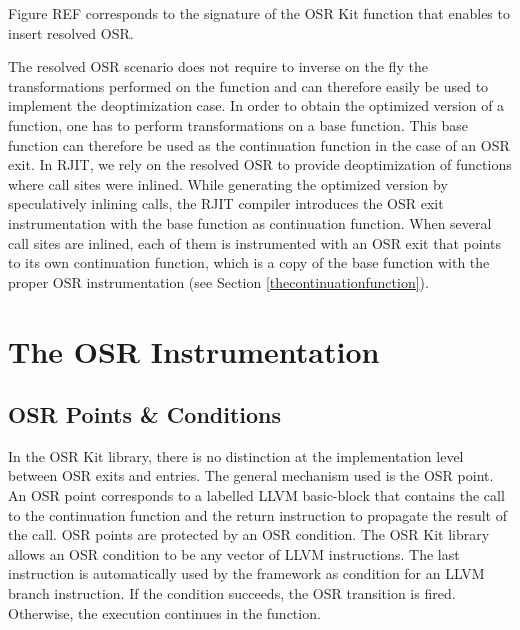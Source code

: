 Figure REF corresponds to the signature of the OSR Kit function that enables to insert resolved OSR.\\

\begin{minipage}{\linewidth}
\end{minipage}

The resolved OSR scenario does not require to inverse on the fly the transformations performed on the function and can therefore easily be used to implement the deoptimization case.
In order to obtain the optimized version of a function, one has to perform transformations on a base function.
This base function can therefore be used as the continuation function in the case of an OSR exit.
In RJIT, we rely on the resolved OSR to provide deoptimization of functions where call sites were inlined.
While generating the optimized version by speculatively inlining calls, the RJIT compiler introduces the OSR exit instrumentation with the base function as continuation function.
When several call sites are inlined, each of them is instrumented with an OSR exit that points to its own continuation function, which is a copy of the base function with the proper OSR instrumentation (see Section \ref{thecontinuationfunction}).\\



\section{The OSR Instrumentation}
\subsection{OSR Points \& Conditions}

In the OSR Kit library\cite{OSRKit}, there is no distinction at the implementation level between OSR exits and entries.
The general mechanism used is the OSR point.
An OSR point corresponds to a labelled LLVM basic-block that contains the call to the continuation function and the return instruction to propagate the result of the call.
OSR points are protected by an OSR condition. 
The OSR Kit library allows an OSR condition to be any vector of LLVM instructions. 
The last instruction is automatically used by the framework as condition for an LLVM branch instruction. 
If the condition succeeds, the OSR transition is fired.
Otherwise, the execution continues in the function.\\


